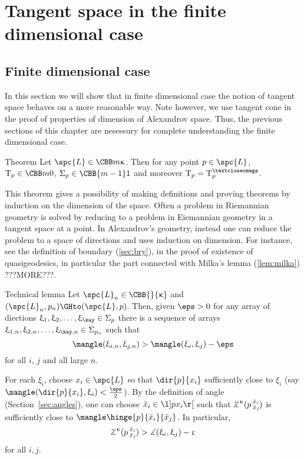 
\chapter{Tangent space in the finite dimensional case}

\section{Finite dimensional case}

In this section we will show that in finite dimensional case the notion of tangent space behaves on a more reasonable way.
Note however, 
we use tangent cone in the proof of properties of dimension of Alexandrov space.
Thus, the previous sections of this chapter are nesessury for complete understanding the finite dimensional case.

\begin{thm}{Theorem}\label{thm:tan4finite} 
Let $\spc{L}\in \CBB m\kappa$. 
Then for any point $p\in \spc{L}$, 
$\T_p\in\CBB m0$, $\Sigma_p\in\CBB{m-1}1$ and moreover $\T_p=\T^\o_p$.
\end{thm}


This theorem gives a possibility of making definitions and proving theorems by induction on the dimension of the space.
Often a problem in Riemannian geometry is solved by 
reducing to a problem in Eiemannian geometry 
in a tangent space at a point.
In Alexandrov's geometry, instead one can reduce the problem 
to a space of directions and uses induction on dimension. 
For instance, see the  
definition of boundary (\ref{sec:bry}), 
in the proof of existence of quasigeodesics, in particular the part connected with Milka's lemma (\ref{lem:milka}) ???MORE???.

\begin{thm}{Technical lemma}\label{lem:tan-tech}
Let $\spc{L}_n\in \CBB{}{\kappa}$ and $(\spc{L}_n,p_n)\GHto(\spc{L},p)$.
Then, given $\eps>0$ for any array of diections $\xi_1,\xi_2,\dots,\xi_\kay\in\Sigma_p$
there is a sequence of  arrays $\xi_{1,n},\xi_{2,n},\dots,\xi_{\kay,n}\in\Sigma_{p_n}$
such that \[\mangle(\xi_{i,n},\xi_{j,n})>\mangle(\xi_i,\xi_j)-\eps\]
for all $i$, $j$ and all large $n$.
\end{thm}

For each $\xi_i$, choose $x_i\in \spc{L}$ so that $\dir{p}{x_i}$ sufficiently close to $\xi_i$ 
(say $\mangle(\dir{p}{x_i},\xi_i)<\tfrac\eps2$).
By the definition of angle (Section~\ref{sec:angles}), 
one can choose $\bar x_i\in\l]px_i\r[$ such that
$\angk{\kappa}{p}{\bar x_i}{\bar x_j}$ is sufficiently close to $\mangle\hinge{p}{\bar x_i}{\bar x_j}$.
In particular,
\[\angk{\kappa}{p}{\bar x_i}{\bar x_j}>\mangle(\xi_i,\xi_j)-\eps\] 
for all $i,j$.

